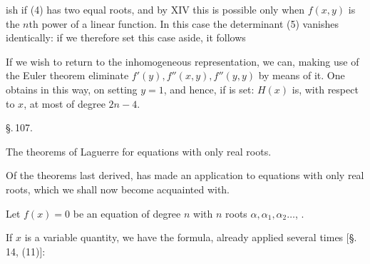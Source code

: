 ish if (4) has two equal roots, and by XIV this is possible only
when $f(x,y)$ is the $n$th power of a linear function.
In this case the determinant (5) vanishes identically: if we
therefore set this case aside, it follows 

If we wish to return to the inhomogeneous representation, we can, making
use of the Euler theorem
eliminate $f'(y), f''(x,y), f''(y,y)$ by means of it. One obtains in this way,
on setting $y = 1$,
and hence, if
is set:
$H(x)$ is, with respect to $x$, at most of degree $2n-4$.

\begin{center}
\S.\,107.

The theorems of Laguerre for equations with only real roots.
\end{center}

Of the theorems last derived,  has made an application
to equations with only real roots, which we shall now become acquainted
with.

Let $f(x) = 0$ be an equation of degree $n$ with $n$ 
roots $\alpha, \alpha_1, \alpha_2 \dots$, .

If $x$ is a variable quantity, we have the formula, already applied
several times [\S.\,14, (11)]:
